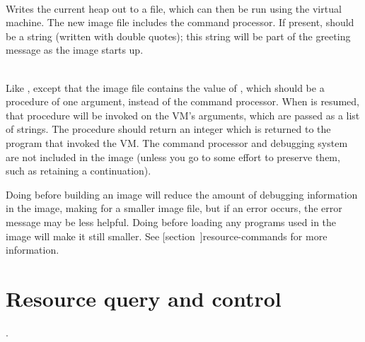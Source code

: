 \begin{description}
\item {}\\
    Writes the current heap out to a file, which can then be run using the
    virtual machine.  The new image file includes the command processor.
    If present, 
    should be a string (written with double quotes); this string will
    be part of the greeting message as the image starts up.

\item {}\\
    Like , except that the image file contains the value of
    , which should be a procedure of one argument, instead of
    the command processor.  When
     is resumed, that procedure will be invoked on the VM's
     arguments, which are passed as a list of strings.  The
    procedure should return an integer which is
    returned to the program that invoked the VM.  The command
    processor and debugging system are not included in the image
    (unless you go to some effort to preserve them, such as retaining
    a continuation).

    Doing  before building an image will reduce the amount
    of debugging information in the image, making for a smaller
    image file, but if an error occurs, the error message may be less
    helpful.  Doing  before loading any programs
    used in the image will make it still smaller.
    See [section~\Ref]{resource-commands}
    for more information.

\end{description}
    
\section{Resource query and control}
\label{resource-commands}.

